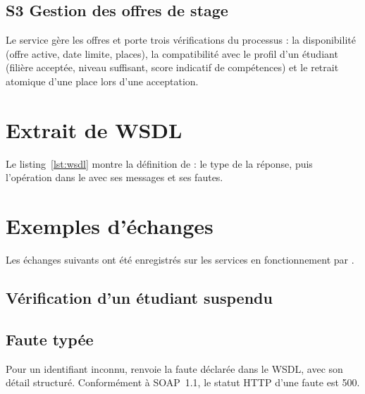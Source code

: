 \subsection{S3 Gestion des offres de stage}
Le service gère les offres et porte trois vérifications du processus : la disponibilité (offre active, date limite, places), la compatibilité avec le profil d'un étudiant (filière acceptée, niveau suffisant, score indicatif de compétences) et le retrait atomique d'une place lors d'une acceptation.
{\small}

\section{Extrait de WSDL}

Le listing~\ref{lst:wsdl} montre la définition de  : le type de la réponse, puis l'opération dans le  avec ses messages et ses fautes.



\section{Exemples d'échanges}

Les échanges suivants ont été enregistrés sur les services en fonctionnement par .

\subsection{Vérification d'un étudiant suspendu}



\subsection{Faute typée}
Pour un identifiant inconnu,  renvoie la faute déclarée dans le WSDL, avec son détail structuré. Conformément à SOAP~1.1, le statut HTTP d'une faute est 500.


